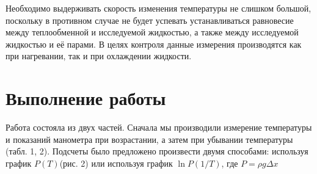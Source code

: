 \documentclass[12pt]{article}
\begin{document}
		Необходимо выдерживать скорость изменения
		температуры не слишком большой, поскольку в противном случае не будет успевать
		устанавливаться равновесие между теплообменной и исследуемой жидкостью, а также между
		исследуемой жидкостью и её парами. В целях контроля данные измерения производятся
		как при нагревании, так и при охлаждении жидкости.
		\newpage
		\section*{Выполнение работы}
		
		Работа состояла из двух частей. Сначала мы производили измерение температуры и показаний манометра при возрастании, а затем при убывании температуры (табл. 1, 2). Подсчеты было предложено произвести двумя способами: используя график $P(T)$(рис. 2) или используя график $\ln P (1/T)$, где $P=\rho g \Delta x$\\
		
\end{document}
